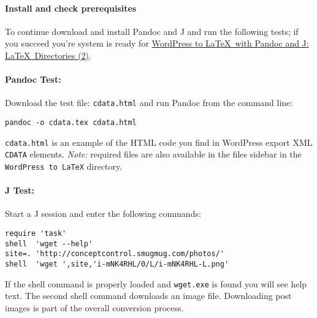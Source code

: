 \paragraph{Install and check prerequisites}

To continue download and install Pandoc and J and run the following
tests; if you succeed you're system is ready for
\href{http://bakerjd99.wordpress.com/2012/02/18/wordpress-to-latex-with-pandoc-and-j-latex-directories-part-2-2/}{WordPress
to \LaTeX\ with Pandoc and J: \LaTeX\ Directories (2)}.

\paragraph{Pandoc Test:} Download the test file: \texttt{cdata.html} and run Pandoc from the
command line:

\begin{tcolorbox}[breakable, size=fbox, boxrule=1pt, pad at break*=1mm,colback=cellbackground, colframe=cellborder]
\begin{verbatim}
pandoc -o cdata.tex cdata.html
\end{verbatim}
\end{tcolorbox}

\noindent \texttt{cdata.html} is an example of the HTML code you find in WordPress
export XML \texttt{CDATA} elements. \emph{Note:} required files are also
available in the files sidebar in the \texttt{WordPress to LaTeX}
directory.

\paragraph{J Test:} Start a J session and enter the following commands:
\begin{tcolorbox}[breakable, size=fbox, boxrule=1pt, pad at break*=1mm,colback=cellbackground, colframe=cellborder]
\begin{lstlisting}[language=jdoc, frame=single,framerule=0pt,label=lst:scr2374x0]
require 'task'
shell  'wget --help'
site=. 'http://conceptcontrol.smugmug.com/photos/'
shell  'wget ',site,'i-mNK4RHL/0/L/i-mNK4RHL-L.png'
\end{lstlisting}
\end{tcolorbox}

\noindent If the shell command is properly loaded and \texttt{wget.exe} is found
you will see help text. The second shell command downloads an image
file. Downloading post images is part of the overall conversion process.




%